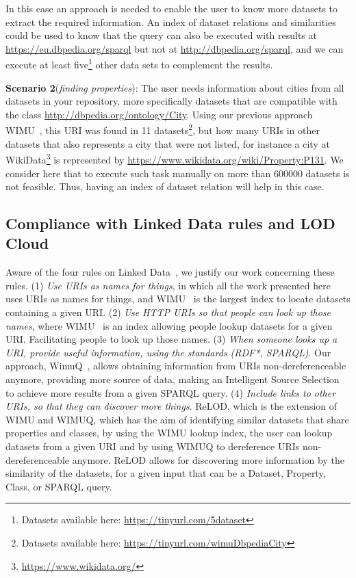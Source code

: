 \documentclass[sw]{iosart2x}
\begin{document}
In this case an approach is needed to enable the user to know more datasets to extract the required information. An index of dataset relations and similarities could be used to know that the query can also be executed with results at \url{https://eu.dbpedia.org/sparql} but not at \url{http://dbpedia.org/sparql}, and we can execute at least five\footnote{Datasets available here: \url{https://tinyurl.com/5dataset}} other data sets to complement the results.

\textbf{Scenario 2}(\textit{finding properties}): The user needs information about cities from all datasets in your repository, more specifically datasets that are compatible with the class \url{http://dbpedia.org/ontology/City}.
Using our previous approach WIMU~\cite{valdestilhas2018my}, this URI was found in 11 datasets\footnote{Datasets available here: \url{https://tinyurl.com/wimuDbpediaCity}}, but how many URIs in other datasets that also represents a city that were not listed, for instance a city at WikiData\footnote{\url{https://www.wikidata.org/}} is represented by  \url{https://www.wikidata.org/wiki/Property:P131}.
We consider here that to execute such task manually on more than \num{600000} datasets is not feasible.
Thus, having an index of dataset relation will help in this case.

\subsection{Compliance with Linked Data rules and LOD Cloud}
Aware of the four rules on Linked Data~\cite{designissues-linkeddata}, we justify our work concerning these rules.%
(1) \textit{Use URIs as names for things}, in which all the work presented here uses URIs as names for things, and WIMU~\cite{valdestilhas2018my} is the largest index to locate datasets containing a given URI.
(2) \textit{Use HTTP URIs so that people can look up those names}, where WIMU~\cite{valdestilhas2018my} is an index allowing people lookup datasets for a given URI. Facilitating people to look up those names. (3) \textit{When someone looks up a URI, provide useful information, using the standards (RDF*, SPARQL)}. Our approach, WimuQ~\cite{valdestilhas2019more}, allows obtaining information from URIs non-dereferenceable anymore, providing more source of data, making an Intelligent Source Selection to achieve more results from a given SPARQL query. (4) \textit{Include links to other URIs, so that they can discover more things}. ReLOD, which is the extension of WIMU and WIMUQ, which has the aim of identifying similar datasets that share properties and classes, by using the WIMU lookup index, the user can lookup datasets from a given URI and by using WIMUQ to dereference URIs non-dereferenceable anymore. ReLOD allows for discovering more information by the similarity of the datasets, for a given input that can be a Dataset, Property, Class, or SPARQL query.
\end{document}
